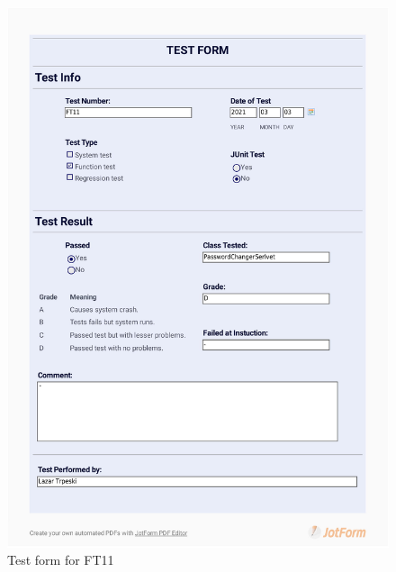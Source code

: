 \documentclass{article}
\begin{document}
 \begin{figure}
     \centering
     \includegraphics[width=13cm]{images/2021-03-03_Lazar_FT11-1}
     \renewcommand\figurename{Figure}
     \caption{Test form for FT11}
     \label{fig:my_label}
 \end{figure}
 
\end{document}
